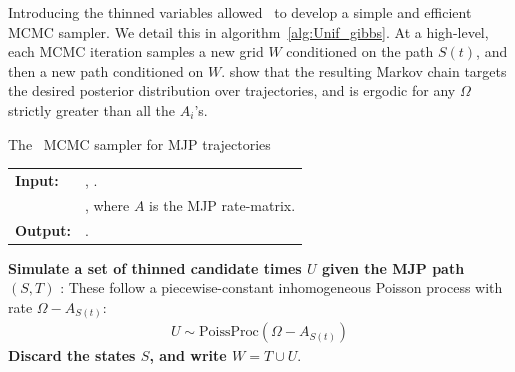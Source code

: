 Introducing the thinned variables allowed~\cite{RaoTeh13} to develop a simple and efficient MCMC sampler. 
We detail this in algorithm~\ref{alg:Unif_gibbs}. 
At a high-level, each MCMC iteration samples a new grid $W$ conditioned on the path $S(t)$, and then a new path conditioned on $W$. 
\cite{RaoTeh13} show that the resulting Markov chain targets the desired posterior distribution over trajectories, and is ergodic for any $\Omega$ strictly greater than all the $A_i$'s. 
\begin{algorithm}[H]
  \caption{The~\cite{RaoTeh13} MCMC sampler for MJP trajectories}
   \label{alg:Unif_gibbs}
  \begin{tabular}{l l}
   \textbf{Input:  } & \text{Prior $\pi_0$, observations $X$}, 
                       \text{the previous path $S(t) = (S, T)$}.\\ 
                     & \text{Parameter $\Omega > \max_i A_i$}, where
   $A$ is the MJP rate-matrix.\\
   \textbf{Output:  }& \text{New MJP trajectory $S' (t) = (S', T')$}.\\
   \hline
   \end{tabular}
   \begin{algorithmic}[1]
\State \textbf{ Simulate a set of thinned candidate times $U$ given the MJP path $(S,T)$ }: 
These follow a piecewise-constant inhomogeneous Poisson process with rate $\Omega-A_{S(t)}$: 
\begin{align*}
  U \sim \text{PoissProc}(\Omega - A_{S(t)}) 
\end{align*}
\State \textbf{
  Discard the states $S$, and write %
  $W = T \cup U$}.


\end{algorithmic}
\end{algorithm}
